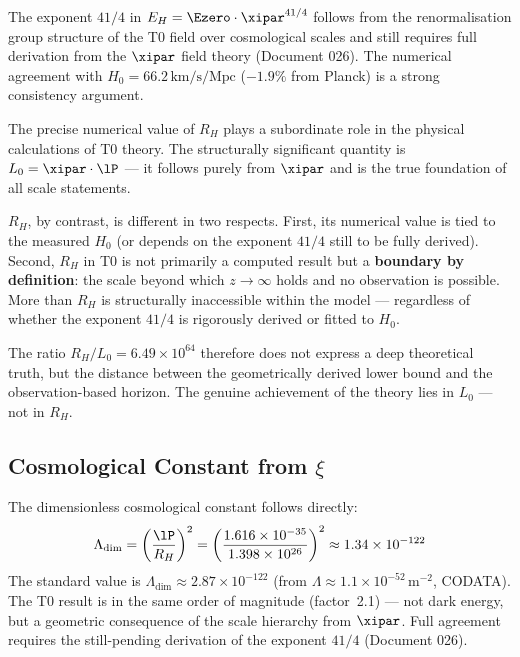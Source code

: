 The exponent $41/4$ in $E_H = \Ezero \cdot \xipar^{41/4}$ follows from the renormalisation group structure of the T0 field over cosmological scales and still requires full derivation from the $\xipar$ field theory (Document 026). The numerical agreement with $H_0 = 66{.}2\,\text{km/s/Mpc}$ ($-1{.}9\%$ from Planck) is a strong consistency argument.

\begin{foundation}
The precise numerical value of $R_H$ plays a subordinate role in the physical calculations of T0 theory. The structurally significant quantity is $L_0 = \xipar \cdot \lP$ — it follows purely from $\xipar$ and is the true foundation of all scale statements.

$R_H$, by contrast, is different in two respects. First, its numerical value is tied to the measured $H_0$ (or depends on the exponent $41/4$ still to be fully derived). Second, $R_H$ in T0 is not primarily a computed result but a \textbf{boundary by definition}: the scale beyond which $z \to \infty$ holds and no observation is possible. More than $R_H$ is structurally inaccessible within the model — regardless of whether the exponent $41/4$ is rigorously derived or fitted to $H_0$.

The ratio $R_H/L_0 = 6{.}49 \times 10^{64}$ therefore does not express a deep theoretical truth, but the distance between the geometrically derived lower bound and the observation-based horizon. The genuine achievement of the theory lies in $L_0$ — not in $R_H$.
\end{foundation}

\subsection{Cosmological Constant from \texorpdfstring{$\xi$}{xi}}

The dimensionless cosmological constant follows directly:
\begin{equation}
	\Lambda_{\text{dim}} = \left(\frac{\lP}{R_H}\right)^2 = \left(\frac{1{.}616 \times 10^{-35}}{1{.}398 \times 10^{26}}\right)^2 \approx 1{.}34 \times 10^{-122}
\end{equation}
The standard value is $\Lambda_{\text{dim}} \approx 2{.}87 \times 10^{-122}$ (from $\Lambda \approx 1{.}1 \times 10^{-52}\,\text{m}^{-2}$, CODATA). The T0 result is in the same order of magnitude (factor~2.1) — not dark energy, but a geometric consequence of the scale hierarchy from $\xipar$. Full agreement requires the still-pending derivation of the exponent $41/4$ (Document 026).

